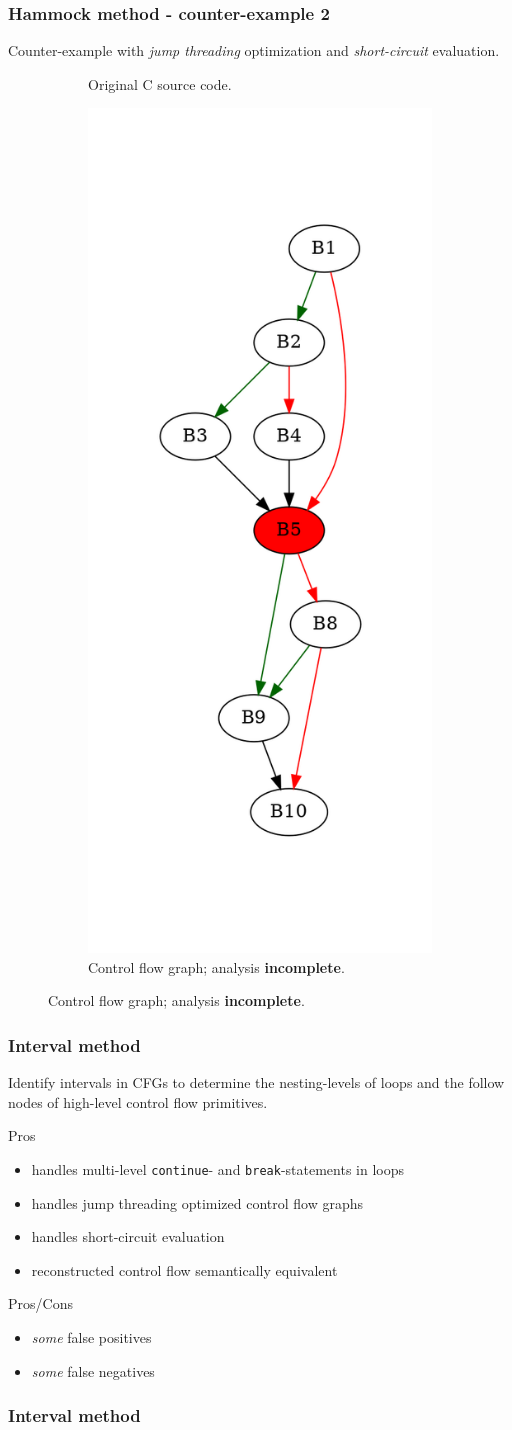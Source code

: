 \documentclass[aspectratio=1610]{beamer}
\begin{document}
\begin{frame}[noframenumbering]
	\frametitle{Hammock method - counter-example 2}
	Counter-example with \textit{jump threading} optimization and \textit{short-circuit} evaluation.
	\begin{figure}[htbp]
		\centering
		\begin{subfigure}[b]{0.30\textwidth}
			\centering
			
			\caption{Original C source code.}
		\end{subfigure}
		\begin{subfigure}[b]{0.50\textwidth}
			\centering
			\includegraphics[height=0.7\paperheight]{inc/methods/hammock/counter-example/jump-threading-and-short-circuit/jump-threading-and-short-circuit_jump/f_0004b.png}
			\caption{Control flow graph; analysis \textbf{incomplete}.}
		\end{subfigure}
	\end{figure}
\end{frame}


\begin{frame}
	\frametitle{Interval method}

	Identify intervals in CFGs to determine the nesting-levels of loops and the follow nodes of high-level control flow primitives.

	\vspace*{2em}

	\begin{block}{Pros}
		\begin{itemize}
			\item handles multi-level \texttt{continue}- and \texttt{break}-statements in loops
			\item handles jump threading optimized control flow graphs
			\item handles short-circuit evaluation
			\item reconstructed control flow semantically equivalent
		\end{itemize}
	\end{block}

	\begin{block}{Pros/Cons}
		\begin{itemize}
			\item \textit{some} false positives
			\item \textit{some} false negatives
		\end{itemize}
	\end{block}

\end{frame}

\begin{frame}
	\frametitle{Interval method}
	\
\end{frame}
\end{document}
